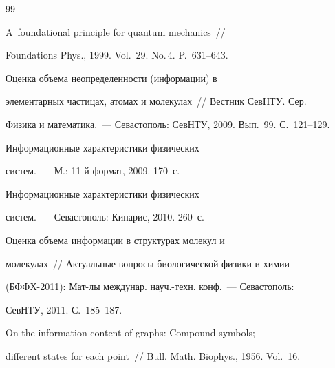 




   


   


   {\small\frenchspacing


{%




\begin{thebibliography}{99}







    A~foundational principle for quantum mechanics~/\!\!/ 


Foundations Phys., 1999. Vol.~29. No.\,4. P.~631--643.




    Оценка объема неопределенности (информации) в 


элементарных частицах, атомах и молекулах~/\!\!/ Вестник СевНТУ. Сер. 


Физика и математика.~--- Севастополь: СевНТУ, 2009. Вып.~99. С.~121--129.




    Информационные характеристики физических 


систем.~--- М.: 11-й формат, 2009. 170~с.




    Информационные характеристики физических 


   сис\-тем.~--- Севастополь: Кипарис, 2010. 260~с.




    Оценка объема информации в структурах молекул и 


молекулах~/\!\!/ Актуальные вопросы биологической физики и химии 


   (БФФХ-2011): Мат-лы междунар. науч.-техн. конф.~--- Севастополь: 


СевНТУ, 2011. С.~185--187.







    On the information content of graphs: Compound symbols; 


different states for each point~/\!\!/ Bull. Math. Biophys., 1956. Vol.~16. 



\end{thebibliography}}}
